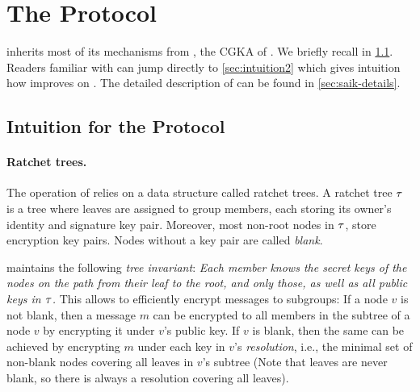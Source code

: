 
\section{The \saik Protocol}\label{sec:saik}
\saik inherits most of its mechanisms from \protITK, the CGKA of \mls. We briefly recall \protITK in
\cref{sec:intuition1}.
Readers familiar with \protITK can jump directly to \cref{sec:intuition2} which gives intuition how \saik improves on \protITK. The detailed description of \saik can be found in \cref{sec:saik-details}.

\subsection{Intuition for the \protITK Protocol}\label{sec:intuition1}

\paragraph{Ratchet trees.}
The operation of \protITK relies on a data structure called ratchet trees. A ratchet tree $\tau$ is a tree where leaves are assigned to group members, each storing its owner's identity and signature key pair. Moreover, most non-root nodes in $\tau$, store encryption key pairs. Nodes without a key pair are called \emph{blank}.

\protITK maintains the following \emph{tree invariant}:
  {\it Each member knows the secret keys of the nodes on the path from their leaf to the root, and only those, as well as all public keys in $\tau$.}
This allows to efficiently encrypt messages to subgroups: If a node $v$ is not blank, then a message $m$ can be
encrypted to all members in the subtree of a node $v$ by encrypting it under $v$'s public key. If $v$ is blank, then the
same can be achieved by encrypting $m$ under each key in $v$'s \emph{resolution}, i.e., the minimal set of non-blank
nodes covering all leaves in $v$'s subtree (Note that leaves are never blank, so there is always a resolution covering
all leaves).

